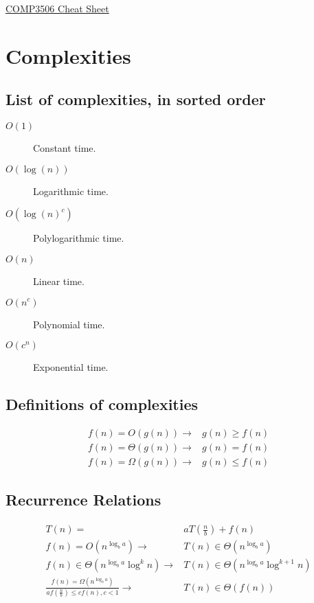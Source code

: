\documentclass[landscape]{cheat}
\begin{document}
\footnotesize
\begin{multicols}{3}

\begin{center}
\Large{\underline{COMP3506 Cheat Sheet}} \\
\end{center}


\section{Complexities}

\subsection{List of complexities, in sorted order}
\begin{description}
    \item[$O(1)$] Constant time.
    \item[$O(\log(n))$] Logarithmic time.
    \item[$O(\log(n)^c)$] Polylogarithmic time.
    \item[$O(n)$] Linear time.
    \item[$O(n^c)$] Polynomial time.
    \item[$O(c^n)$] Exponential time.
\end{description}

\subsection{Definitions of complexities}
\begin{align*}
    f(n) = O(g(n)) \rightarrow& g(n) \geq f(n) \\
    f(n) = \Theta(g(n)) \rightarrow& g(n) = f(n) \\
    f(n) = \Omega(g(n)) \rightarrow& g(n) \leq f(n)
\end{align*}

\subsection{Recurrence Relations}
\begin{align*}
    T(n) =& a T(\frac n b) + f(n) \\
    f(n) = O(n^{\log_b a}) \rightarrow& T(n) \in \Theta(n^{\log_b a}) \\
    f(n) \in \Theta(n^{\log_b a} \log^k n) \rightarrow& T(n) \in \Theta(n^{\log_b a} \log^{k+1} n) \\
    \frac {f(n) = \Omega(n^{\log_b a})} {af(\frac n b) \leq cf(n), c < 1} \rightarrow& T(n) \in \Theta(f(n)) \\
\end{align*}


\end{multicols}
\end{document}
